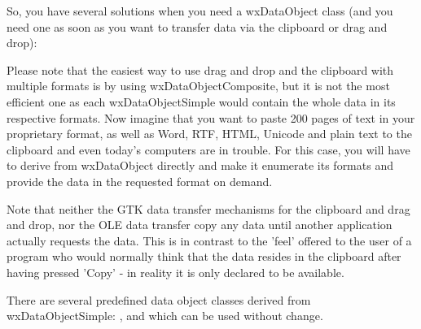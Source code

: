 So, you have several solutions when you need a wxDataObject class (and you need
one as soon as you want to transfer data via the clipboard or drag and drop):

\begin{twocollist}\itemsep=1cm
\end{twocollist}

Please note that the easiest way to use drag and drop and the clipboard with
multiple formats is by using wxDataObjectComposite, but it is not the most
efficient one as each wxDataObjectSimple would contain the whole data in its
respective formats. Now imagine that you want to paste 200 pages of text in
your proprietary format, as well as Word, RTF, HTML, Unicode and plain text to
the clipboard and even today's computers are in trouble. For this case, you
will have to derive from wxDataObject directly and make it enumerate its
formats and provide the data in the requested format on demand.

Note that neither the GTK data transfer mechanisms for the clipboard and
drag and drop, nor the OLE data transfer copy any data until another application
actually requests the data. This is in contrast to the 'feel' offered to the
user of a program who would normally think that the data resides in the
clipboard after having pressed 'Copy' - in reality it is only declared to be
available.

There are several predefined data object classes derived from
wxDataObjectSimple: , 
 and 
 which can be used without
change.

